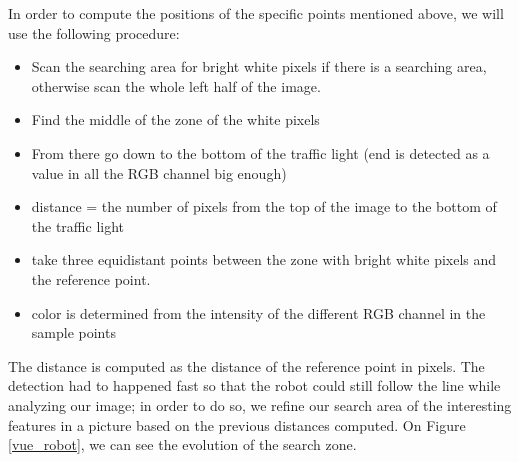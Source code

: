 \documentclass[14pt,a4paper]{article}
\theoremstyle{definition}
\begin{document}
In order to compute the positions of the specific points mentioned above, we will use the following procedure: 
\begin{itemize}
\item Scan the searching area for bright white pixels if there is a searching area, otherwise scan the whole left half of the image.
\item Find the middle of the zone of the white pixels
\item  From there go down to the bottom of the traffic light (end is detected as a value in all the RGB channel big enough)
\item distance = the number of pixels from the top of the image to the bottom of the traffic light
\item take three equidistant points between the zone with bright white pixels and the reference point.
 \item color is determined from the intensity of the different RGB channel in the sample points  
\end{itemize}

The distance is computed as the distance of the reference point in pixels. The detection had to happened fast so that the robot could still follow the line while analyzing our image; in order to do so, we refine our search area of the interesting features in a picture based on the previous distances computed. On Figure \ref{vue_robot}, we can see the evolution of the search zone.
\end{document}
